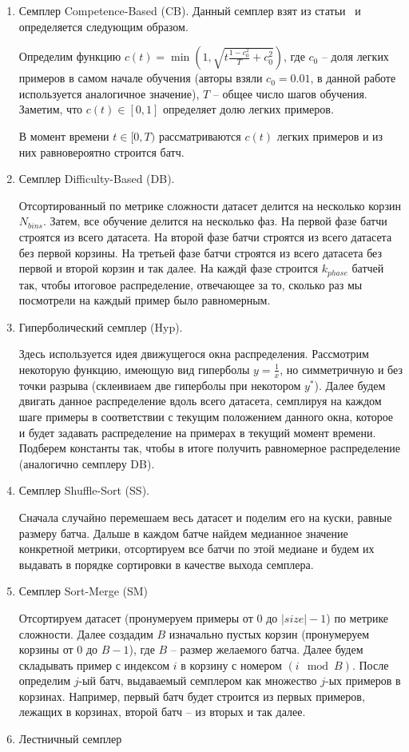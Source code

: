 \documentclass{spbau-diploma}
\begin{document}
\begin{enumerate}
	\item Семплер Competence-Based (CB). Данный семплер взят из статьи~\cite{platanios2019competence} и определяется следующим образом.
	
	Определим функцию $c(t) = \min\left(1, \sqrt{t\frac{1 - c_0^2}{T} + c_0^2}\right)$, где $c_0$ -- доля легких примеров в самом начале обучения (авторы взяли $c_0 = 0.01$, в данной работе используется аналогичное значение), $T$ -- общее число шагов обучения. Заметим, что $c(t) \in [0, 1]$ определяет долю легких примеров.
	
	В момент времени $t \in [0, T)$ рассматриваются $c(t)$ легких примеров и из них равновероятно строится батч.
	
	\item Семплер Difficulty-Based (DB).
	
	Отсортированный по метрике сложности датасет делится на несколько корзин $N_{bins}$. Затем, все обучение делится на несколько фаз. На первой фазе батчи строятся из всего датасета. На второй фазе батчи строятся из всего датасета без первой корзины. На третьей фазе батчи строятся из всего датасета без первой и второй корзин и так далее. На каждй фазе строится $k_{phase}$ батчей так, чтобы итоговое распределение, отвечающее за то, сколько раз мы посмотрели на каждый пример было равномерным.
	
	\item Гиперболический семплер (Hyp). 
	
	Здесь используется идея движущегося окна распределения. Рассмотрим некоторую функцию, имеющую вид гиперболы $y=\frac 1 x$, но симметричную и без точки разрыва (склеивиаем две гиперболы при некотором $y^*$). Далее будем двигать данное распределение вдоль всего датасета, семплируя на каждом шаге примеры в соответствии с текущим положением данного окна, которое и будет задавать распределение на примерах в текущий момент времени. Подберем константы так, чтобы в итоге получить равномерное распределение (аналогично семплеру DB).
	\item Семплер Shuffle-Sort (SS).
	
	Сначала случайно перемешаем весь датасет и поделим его на куски, равные размеру батча. Дальше в каждом батче найдем медианное значение конкретной метрики, отсортируем все батчи по этой медиане и будем их выдавать в порядке сортировки в качестве выхода семплера.
	\item Семплер Sort-Merge (SM)
	
	Отсортируем датасет (пронумеруем примеры от $0$ до $|size| - 1$) по метрике сложности. Далее создадим $B$ изначально пустых корзин (пронумеруем корзины от $0$ до $B - 1$), где $B$ -- размер желаемого батча. Далее будем складывать пример с индексом $i$ в корзину с номером $(i \mod B)$. После определим $j$-ый батч, выдаваемый семплером как множество $j$-ых примеров в корзинах. Например, первый батч будет строится из первых примеров, лежащих в корзинах, второй батч -- из вторых и так далее.
	\item Лестничный семплер
	

\end{enumerate}
\end{document}
